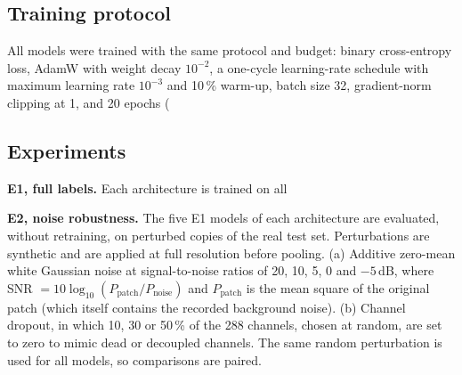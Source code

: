 \subsection*{Training protocol}
All models were trained with the same protocol and budget: binary cross-entropy loss, AdamW \citep{Loshchilov2019} with weight decay $10^{-2}$, a one-cycle learning-rate schedule \citep{SmithTopin2019} with maximum learning rate $10^{-3}$ and 10\,\% warm-up, batch size 32, gradient-norm clipping at 1, and 20 epochs (%

\subsection*{Experiments}
\textbf{E1, full labels.} Each architecture is trained on all %

\textbf{E2, noise robustness.} The five E1 models of each architecture are evaluated, without retraining, on perturbed copies of the real test set. Perturbations are synthetic and are applied at full resolution before pooling. (a) Additive zero-mean white Gaussian noise at signal-to-noise ratios of 20, 10, 5, 0 and $-5$\,dB, where SNR $=10\log_{10}(P_\mathrm{patch}/P_\mathrm{noise})$ and $P_\mathrm{patch}$ is the mean square of the original patch (which itself contains the recorded background noise). (b) Channel dropout, in which 10, 30 or 50\,\% of the 288 channels, chosen at random, are set to zero to mimic dead or decoupled channels. The same random perturbation is used for all models, so comparisons are paired.

